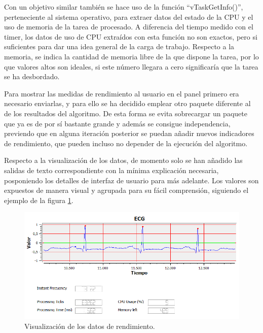         
        Con un objetivo similar también se hace uso de la función ``vTaskGetInfo()'', perteneciente al sistema operativo, para extraer datos del estado de la CPU y el uso de memoria de la tarea de procesado. A diferencia del tiempo medido con el timer, los datos de uso de CPU extraídos con esta función no son exactos, pero si suficientes para dar una idea general de la carga de trabajo. Respecto a la memoria, se indica la cantidad de memoria libre de la que dispone la tarea, por lo que valores altos son ideales, si este número llegara a cero significaría que la tarea se ha desbordado. 
        
        Para mostrar las medidas de rendimiento al usuario en el panel primero era necesario enviarlas, y para ello se ha decidido emplear otro paquete diferente al de los resultados del algoritmo. De esta forma se evita sobrecargar un paquete que ya es de por sí bastante grande y además se consigue independencia, previendo que en alguna iteración posterior se puedan añadir nuevos indicadores de rendimiento, que pueden incluso no depender de la ejecución del algoritmo.
        
        Respecto a la visualización de los datos, de momento solo se han añadido las salidas de texto correspondiente con la mínima explicación necesaria, posponiendo los detalles de interfaz de usuario para más adelante. Los valores son expuestos de manera visual y agrupada para su fácil comprensión, siguiendo el ejemplo de la figura \ref{fig:performance}.
        
        \begin{figure}[H]
                \centering
                        \includegraphics[width = 0.9 \linewidth]{figuras/Performance.PNG}
                \caption{Visualización de los datos de rendimiento.}
                \label{fig:performance}
        \end{figure}
        
